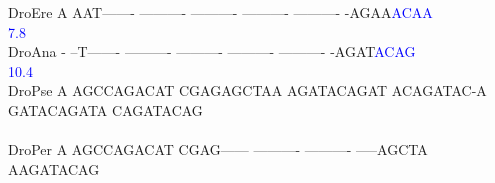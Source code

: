 \documentclass[11pt,twoside,reqno,a4paper]{article}
\begin{document}
{DroEre	A	AAT-------	----------	----------	----------	----------	-AGAA\textcolor{Blue}{A}\textcolor{Blue}{C}\textcolor{Blue}{A}\textcolor{Blue}{A}\\
\hspace*{7\charwidth}\hspace*{1\charwidth}\hspace*{1\charwidth}\hspace*{1\charwidth}\hspace*{1\charwidth}\hspace*{1\charwidth}\hspace*{1\charwidth}\hspace*{56\charwidth}\textcolor{Blue}{7.8}\\
DroAna	-	--T-------	----------	----------	----------	----------	-AGAT\textcolor{Blue}{A}\textcolor{Blue}{C}\textcolor{Blue}{A}\textcolor{Blue}{G}\\
\hspace*{7\charwidth}\hspace*{1\charwidth}\hspace*{1\charwidth}\hspace*{1\charwidth}\hspace*{1\charwidth}\hspace*{1\charwidth}\hspace*{1\charwidth}\hspace*{56\charwidth}\textcolor{Blue}{10.4}\hspace*{1\charwidth}\\
DroPse	A	AGCCAGACAT	CGAGAGCTAA	AGATACAGAT	ACAGATAC-A	GATACAGATA	CAGATACAG\\
\hspace*{7\charwidth}\hspace*{1\charwidth}\hspace*{1\charwidth}\hspace*{1\charwidth}\hspace*{1\charwidth}\hspace*{1\charwidth}\hspace*{1\charwidth}\\
DroPer	A	AGCCAGACAT	CGAG------	----------	----------	-----AGCTA	AAGATACAG\\
\hspace*{7\charwidth}\hspace*{1\charwidth}\hspace*{1\charwidth}\hspace*{1\charwidth}\hspace*{1\charwidth}\hspace*{1\charwidth}\hspace*{1\charwidth}\\
}
\end{document}
